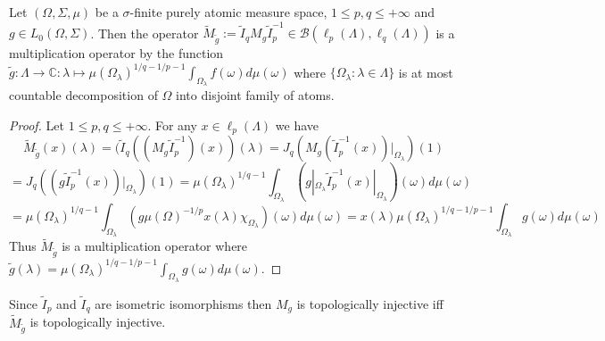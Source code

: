 \begin{proposition}\label{EquivMultOp} Let $(\Omega,\Sigma,\mu)$ be a $\sigma$-finite purely atomic measure space, $1\leq p,q\leq +\infty$ and $g\in L_0(\Omega,\Sigma)$. Then the operator $\widetilde{M}_{\widetilde{g}}:=\widetilde{I}_q M_g\widetilde{I}_p^{-1}\in\mathcal{B}(\ell_p(\Lambda),\ell_q(\Lambda))$ is a multiplication operator by the function $\widetilde{g}:\Lambda\to\mathbb{C}:\lambda\mapsto \mu(\Omega_\lambda)^{1/q-1/p-1}\int_{\Omega_\lambda}f(\omega)d\mu(\omega)$ where $\{\Omega_\lambda:\lambda\in\Lambda\}$ is at most countable decomposition of $\Omega$ into disjoint family of atoms.
\end{proposition}
\begin{proof} Let $1\leq p,q\leq +\infty$. For any $x\in\ell_p(\Lambda)$ we have
$$
\widetilde{M}_{\widetilde{g}}(x)(\lambda)
=(\widetilde{I}_q((M_g\widetilde{I}_p^{-1})(x))(\lambda)
=J_q(M_g(\widetilde{I}_p^{-1}(x))|_{\Omega_\lambda})(1)
$$
$$
=J_q((g \widetilde{I}_p^{-1}(x))|_{\Omega_\lambda})(1)
=\mu(\Omega_\lambda)^{1/q-1}\int_{\Omega_\lambda}(g|_{\Omega_\lambda} \widetilde{I}_p^{-1}(x)|_{\Omega_\lambda})(\omega)d\mu(\omega)
$$
$$
=\mu(\Omega_\lambda)^{1/q-1}\int_{\Omega_\lambda}(g \mu(\Omega)^{-1/p}x(\lambda)\chi_{\Omega_{\lambda}})(\omega)d\mu(\omega)
=x(\lambda)\mu(\Omega_\lambda)^{1/q-1/p-1}\int_{\Omega_\lambda} g(\omega)d\mu(\omega)
$$
Thus $\widetilde{M}_{\widetilde{g}}$ is a multiplication operator where $\widetilde{g}(\lambda)=\mu(\Omega_\lambda)^{1/q-1/p-1}\int_{\Omega_\lambda} g(\omega)d\mu(\omega)$.
\end{proof}

Since $\widetilde{I}_p$ and $\widetilde{I}_q$ are isometric isomorphisms then $M_g$ is topologically injective iff $\widetilde{M}_{\widetilde{g}}$ is topologically injective. 

